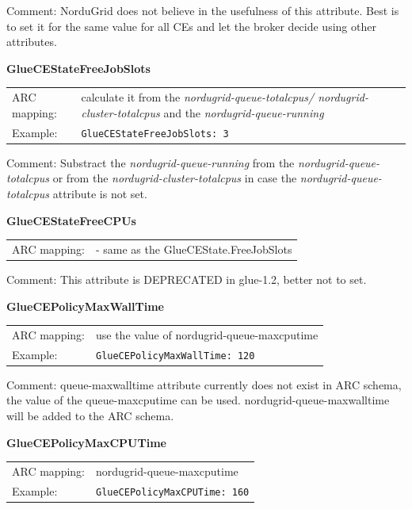 \documentclass{article}
\begin{document}
Comment: NorduGrid does not believe in the usefulness of this attribute. 
Best is to set it for the same value for all CEs and let the broker decide 
using other attributes.


\hspace*{0.5cm}
\begin{shaded}
 \textbf{GlueCEStateFreeJobSlots} 
\end{shaded}
\begin{tabular}{lp{10cm}}  
  ARC mapping:& calculate it from the {\it nordugrid-queue-totalcpus/
    nordugrid-cluster-totalcpus} and the {\it nordugrid-queue-running}\\
  Example:& \verb#GlueCEStateFreeJobSlots: 3#\\
\end{tabular}

Comment: Substract the {\it nordugrid-queue-running} from the 
{\it nordugrid-queue-totalcpus} or from the 
{\it nordugrid-cluster-totalcpus} in case the {\it nordugrid-queue-totalcpus}
attribute is not set.


\hspace*{0.5cm}
\begin{shaded}
 \textbf{GlueCEStateFreeCPUs} 
\end{shaded}
\begin{tabular}{lp{10cm}}  
  ARC mapping:&  - same as the GlueCEState.FreeJobSlots\\   
\end{tabular}

Comment: This attribute is DEPRECATED in glue-1.2, better not to 
set.


\hspace*{0.5cm}
\begin{shaded}
 \textbf{GlueCEPolicyMaxWallTime} 
\end{shaded}
\begin{tabular}{lp{10cm}}  
  ARC mapping:& use the value of nordugrid-queue-maxcputime \\
  Example:& \verb#GlueCEPolicyMaxWallTime: 120#\\
\end{tabular}

Comment: queue-maxwalltime attribute currently does not exist in ARC schema, 
the value of the queue-maxcputime can be used. nordugrid-queue-maxwalltime
will be added to the ARC schema.


\hspace*{0.5cm}
\begin{shaded}
 \textbf{GlueCEPolicyMaxCPUTime} 
\end{shaded}
\begin{tabular}{lp{10cm}}  
  ARC mapping:& nordugrid-queue-maxcputime\\
  Example:& \verb#GlueCEPolicyMaxCPUTime: 160#\\
\end{tabular}
\end{document}
